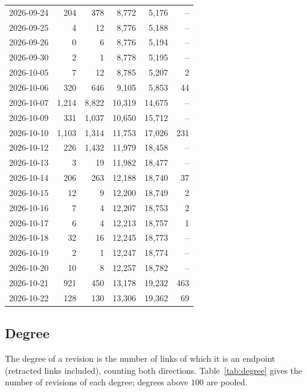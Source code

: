 \begin{longtable}{lrrrrr}
2026-09-24 & 204 & 378 & 8{,}772 & 5{,}176 & --\\
2026-09-25 & 4 & 12 & 8{,}776 & 5{,}188 & --\\
2026-09-26 & 0 & 6 & 8{,}776 & 5{,}194 & --\\
2026-09-30 & 2 & 1 & 8{,}778 & 5{,}195 & --\\
2026-10-05 & 7 & 12 & 8{,}785 & 5{,}207 & 2\\
2026-10-06 & 320 & 646 & 9{,}105 & 5{,}853 & 44\\
2026-10-07 & 1{,}214 & 8{,}822 & 10{,}319 & 14{,}675 & --\\
2026-10-09 & 331 & 1{,}037 & 10{,}650 & 15{,}712 & --\\
2026-10-10 & 1{,}103 & 1{,}314 & 11{,}753 & 17{,}026 & 231\\
2026-10-12 & 226 & 1{,}432 & 11{,}979 & 18{,}458 & --\\
2026-10-13 & 3 & 19 & 11{,}982 & 18{,}477 & --\\
2026-10-14 & 206 & 263 & 12{,}188 & 18{,}740 & 37\\
2026-10-15 & 12 & 9 & 12{,}200 & 18{,}749 & 2\\
2026-10-16 & 7 & 4 & 12{,}207 & 18{,}753 & 2\\
2026-10-17 & 6 & 4 & 12{,}213 & 18{,}757 & 1\\
2026-10-18 & 32 & 16 & 12{,}245 & 18{,}773 & --\\
2026-10-19 & 2 & 1 & 12{,}247 & 18{,}774 & --\\
2026-10-20 & 10 & 8 & 12{,}257 & 18{,}782 & --\\
2026-10-21 & 921 & 450 & 13{,}178 & 19{,}232 & 463\\
2026-10-22 & 128 & 130 & 13{,}306 & 19{,}362 & 69\\
\end{longtable}

\subsection*{Degree}
The degree of a revision is the number of links of which it is an endpoint (retracted links included), counting both directions. Table~\ref{tab:degree} gives the number of revisions of each degree; degrees above $100$ are pooled.

